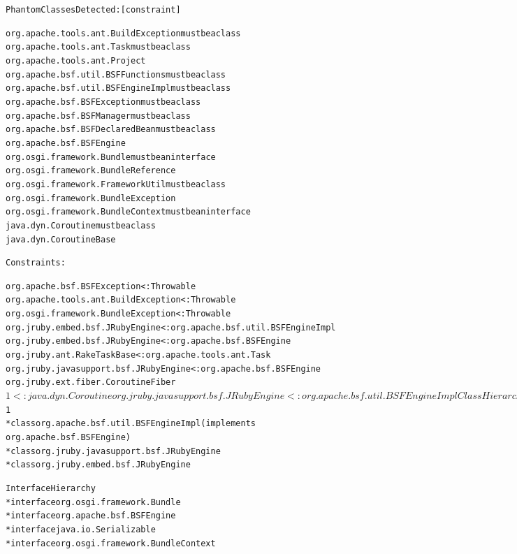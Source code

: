 \begin{alltt}\footnotesize
\vspace{2em}
Phantom Classes Detected: \hfill{[constraint]}

org.apache.tools.ant.BuildException \hfill{must be a class}
org.apache.tools.ant.Task \hfill{must be a class}
org.apache.tools.ant.Project
org.apache.bsf.util.BSFFunctions \hfill{must be a class}
org.apache.bsf.util.BSFEngineImpl \hfill{must be a class}
org.apache.bsf.BSFException \hfill{must be a class}
org.apache.bsf.BSFManager \hfill{must be a class}
org.apache.bsf.BSFDeclaredBean \hfill{must be a class}
org.apache.bsf.BSFEngine
org.osgi.framework.Bundle \hfill{must be an interface}
org.osgi.framework.BundleReference
org.osgi.framework.FrameworkUtil \hfill{must be a class}
org.osgi.framework.BundleException
org.osgi.framework.BundleContext \hfill{must be an interface}
java.dyn.Coroutine \hfill{must be a class}
java.dyn.CoroutineBase

Constraints:

org.apache.bsf.BSFException <: Throwable
org.apache.tools.ant.BuildException <: Throwable
org.osgi.framework.BundleException <: Throwable
org.jruby.embed.bsf.JRubyEngine <: org.apache.bsf.util.BSFEngineImpl
org.jruby.embed.bsf.JRubyEngine <: org.apache.bsf.BSFEngine
org.jruby.ant.RakeTaskBase <: org.apache.tools.ant.Task
org.jruby.javasupport.bsf.JRubyEngine <: org.apache.bsf.BSFEngine
org.jruby.ext.fiber.CoroutineFiber$1 <: java.dyn.Coroutine
org.jruby.javasupport.bsf.JRubyEngine <: org.apache.bsf.util.BSFEngineImpl

Class Hierarchy
* class java.lang.Object
  * class org.apache.bsf.BSFManager
  * class org.osgi.framework.FrameworkUtil
  * class Throwable (implements java.io.Serializable)
    * class org.osgi.framework.BundleException
    * class org.apache.tools.ant.BuildException
    * class org.apache.bsf.BSFException
  * class org.apache.bsf.BSFDeclaredBean
  * class org.apache.bsf.util.BSFFunctions
  * class org.apache.tools.ant.Task
    * class org.jruby.ant.RakeTaskBase
  * class java.dyn.Coroutine
    * class org.jruby.ext.fiber.CoroutineFiber$1
  * class org.apache.bsf.util.BSFEngineImpl (implements
     org.apache.bsf.BSFEngine)
    * class org.jruby.javasupport.bsf.JRubyEngine
    * class org.jruby.embed.bsf.JRubyEngine

Interface Hierarchy
* interface org.osgi.framework.Bundle
* interface org.apache.bsf.BSFEngine
* interface java.io.Serializable
* interface org.osgi.framework.BundleContext
\end{alltt}

